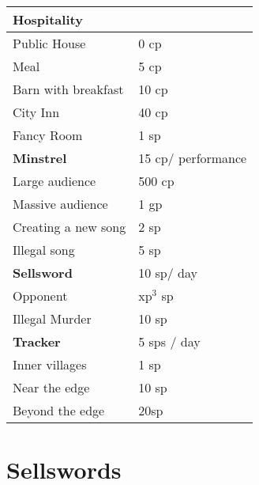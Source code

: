 \begin{multicols*}{2}
\begin{tabularx}{\linewidth}{XX}
\end{tabularx}

\noindent
\begin{tabularx}{\linewidth}{XX}
\hline
\textbf{Hospitality} &  \\\hline

Public House & 0 \gls{cp} \\

Meal & 5 \gls{cp} \\

Barn with breakfast & 10 \gls{cp} \\

City Inn & 40 \gls{cp} \\

Fancy Room & 1 \gls{sp} \\\hline

\textbf{Minstrel} &  15 \gls{cp}/ performance \\\hline

Large audience & 500 \gls{cp} \\

Massive audience & 1 \gls{gp} \\

Creating a new song & 2 \gls{sp} \\

Illegal song & 5 \gls{sp} \\\hline

\textbf{Sellsword} & 10 \gls{sp}/ day \\\hline

Opponent & \gls{xp}$^3$ \gls{sp} \\

Illegal Murder & 10 \gls{sp} \\\hline

\textbf{Tracker} &  5 \glspl{sp} / day \\\hline

  Inner \glspl{village} & 1 \gls{sp} \\
  Near the \gls{edge} & 10 \gls{sp} \\
  Beyond the \gls{edge} & 20\gls{sp} \\
\hline

\end{tabularx}

\end{multicols*}

\cleardoublepage

\section*{Sellswords}

